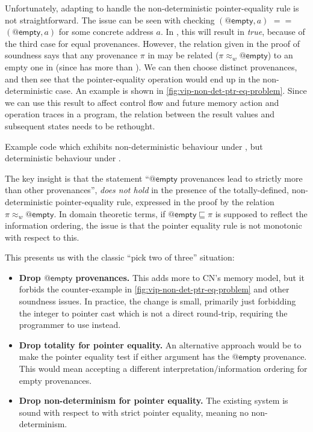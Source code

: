 Unfortunately, adapting  to handle the non-deterministic
pointer-equality rule is not straightforward. The issue can be seen with checking
$(@\mathsf{empty}, a)$ $==$ $(@\mathsf{empty}, a)$ for some concrete address $a$.
In , this will result in \emph{true}, because of the third case for
equal provenances. However, the relation given in the proof of soundness says
that any provenance $\pi$ in  may be related ($\pi \approx_w
@\mathsf{empty}$) to an empty one in  (since  has more 
than ). We can then choose distinct provenances, and then see
that the pointer-equality operation would end up in the non-deterministic case.
An example is shown in \cref{fig:vip-non-det-ptr-eq-problem}.
Since we can use this result to affect control flow and future memory action
and operation traces in a program, the relation between the result values and
subsequent states needs to be rethought.

\begin{marginfigure}
    \caption{Example code which exhibits non-deterministic behaviour under
        , but deterministic behaviour under
        .}\label{fig:vip-non-det-ptr-eq-problem}
\end{marginfigure}

The key insight is that the statement ``$@\mathsf{empty}$ provenances lead to
strictly more  than other provenances'', \emph{does not hold} in the
presence of the totally-defined, non-deterministic pointer-equality rule,
expressed in the proof by the relation $\pi \approx_w @\mathsf{empty}$. In
domain theoretic terms, if $@\mathsf{empty} \sqsubseteq \pi$ is supposed to
reflect the information ordering, the issue is that the pointer equality rule
is not monotonic with respect to this.

This presents us with the classic ``pick two of three'' situation:
\begin{itemize}
    \item \textbf{Drop $@\mathsf{empty}$ provenances.} This adds more 
        to CN's memory model, but it forbids the counter-example in
        \cref{fig:vip-non-det-ptr-eq-problem} and other soundness
        issues.
        In practice, the change is small, primarily just forbidding the integer
        to pointer cast which is not a direct round-trip, requiring the
        programmer to use  instead.
    \item \textbf{Drop totality for pointer equality.} An alternative approach
        would be to make the pointer equality test  if either argument
        has the $@\mathsf{empty}$ provenance. This would mean accepting a
        different interpretation/information ordering for empty provenances.
    \item \textbf{Drop non-determinism for pointer equality.} The existing
         system is sound with respect to  with strict
        pointer equality, meaning no non-determinism.
\end{itemize}

